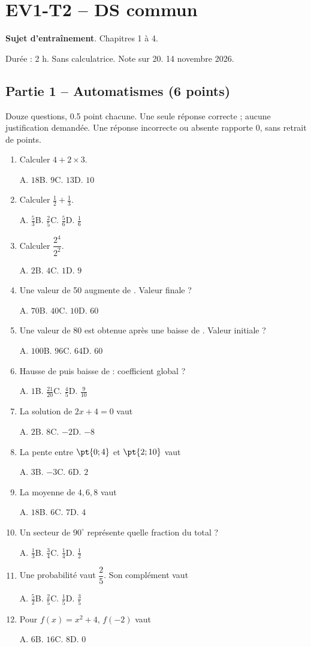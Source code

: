 \mxnewpage\section*{EV1-T2 -- DS commun}\label{EV1-T2}
\textbf{Sujet d’entraînement}. Chapitres 1 à 4.\par Durée : 2 h. Sans calculatrice. Note sur 20. 14 novembre 2026.
\subsection*{Partie 1 -- Automatismes (6 points)}
Douze questions, \num{0,5} point chacune. Une seule réponse correcte ; aucune justification demandée. Une réponse incorrecte ou absente rapporte 0, sans retrait de points.
\begin{enumerate}
\item Calculer $4+2\times3$.\par A. $18$\quad B. $9$\quad C. $13$\quad D. $10$
\item Calculer $\frac12+\frac13$.\par A. $\frac{5}{3}$\quad B. $\frac{2}{5}$\quad C. $\frac{5}{6}$\quad D. $\frac{1}{6}$
\item Calculer $\dfrac{2^4}{2^{2}}$.\par A. $2$\quad B. $4$\quad C. $1$\quad D. $9$
\item Une valeur de 50 augmente de . Valeur finale ?\par A. $70$\quad B. $40$\quad C. $10$\quad D. $60$
\item Une valeur de 80 est obtenue après une baisse de . Valeur initiale ?\par A. $100$\quad B. $96$\quad C. $64$\quad D. $60$
\item Hausse de  puis baisse de  : coefficient global ?\par A. $1$\quad B. $\frac{21}{20}$\quad C. $\frac{4}{5}$\quad D. $\frac{9}{10}$
\item La solution de $2x+4=0$ vaut\par A. $2$\quad B. $8$\quad C. $-2$\quad D. $-8$
\item La pente entre $\pt{0;4}$ et $\pt{2;10}$ vaut\par A. $3$\quad B. $-3$\quad C. $6$\quad D. $2$
\item La moyenne de $4, 6, 8$ vaut\par A. $18$\quad B. $6$\quad C. $7$\quad D. $4$
\item Un secteur de $90^\circ$ représente quelle fraction du total ?\par A. $\frac{1}{3}$\quad B. $\frac{3}{4}$\quad C. $\frac{1}{4}$\quad D. $\frac{1}{2}$
\item Une probabilité vaut $\dfrac{2}{5}$. Son complément vaut\par A. $\frac{5}{2}$\quad B. $\frac{2}{5}$\quad C. $\frac{1}{5}$\quad D. $\frac{3}{5}$
\item Pour $f(x)=x^2+4$, $f(-2)$ vaut\par A. $6$\quad B. $16$\quad C. $8$\quad D. $0$
\end{enumerate}
